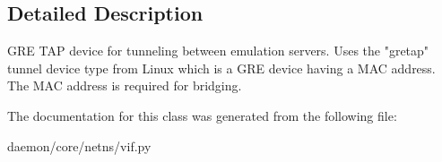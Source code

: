 \subsection{Detailed Description}
\begin{DoxyVerb}GRE TAP device for tunneling between emulation servers.
    Uses the "gretap" tunnel device type from Linux which is a GRE device
    having a MAC address. The MAC address is required for bridging.
\end{DoxyVerb}
 

The documentation for this class was generated from the following file\+:\begin{DoxyCompactItemize}
\item 
daemon/core/netns/vif.\+py\end{DoxyCompactItemize}
